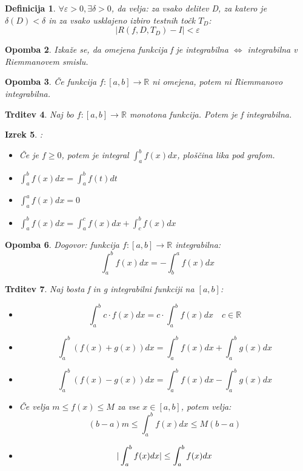 \documentclass[11pt]{article}
\newtheorem{Izrek}{{\sc Izrek}}[section]
\newtheorem{Trditev}[Izrek]{{\sc Trditev}}
\newtheorem{Definicija}[Izrek]{{\sc Definicija}}
\newtheorem{Opomba}[Izrek]{{\sc Opomba}}
\begin{document}
\begin{Definicija}
	$\forall \varepsilon > 0, \exists \delta >0$, da velja: za vsako delitev D, za katero je $\delta(D) < \delta$ in za vsako usklajeno izbiro testnih točk $T_D$:
	$$|R(f,D,T_D) - I| < \varepsilon$$
\end{Definicija}
\begin{Opomba}
	Izkaže se, da omejena funkcija f je integrabilna $\iff$ integrabilna v Riemmanovem smislu.
\end{Opomba}
\begin{Opomba}
	Če funkcija $f:[a,b] \to \mathbb{R}$ ni omejena, potem ni Riemmanovo integrabilna.
\end{Opomba}
\begin{Trditev}
	Naj bo $f:[a,b] \to \mathbb{R}$ monotona funkcija. Potem je f integrabilna.
\end{Trditev}
\begin{Izrek}:
	\begin{itemize}
		\item
		Če je $f \ge 0$, potem je integral $\int_{a}^{b}{f(x) dx}$, ploščina lika pod grafom.
		\item
		$\int_{a}^{b}{f(x)dx} = \int_{a}^{b}{f(t) dt}$	
		\item
		$\int_{a}^{a}{f(x) dx} = 0$
		\item
		$\int_{a}^{b}{f(x) dx} = \int_{a}^{c}{f(x) dx} + \int_{c}^{b}{f(x) dx}$	
	\end{itemize}
\end{Izrek}
\begin{Opomba}
	Dogovor: funkcija $f:[a,b] \to \mathbb{R}$ integrabilna: $$\int_{a}^{b}{f(x) dx} = - \int_{b}^{a}{f(x) dx}$$
\end{Opomba}
\begin{Trditev}
	Naj bosta f in g integrabilni funkciji na $[a,b]$:
	\begin{itemize}
		\item
		$$\int_{a}^{b}{c\cdot f(x) dx} = c\cdot  \int_{a}^{b}{f(x) dx} \quad c\in \mathbb{R}$$
		\item
		$$\int_{a}^{b}{(f(x)+g(x)) dx} =\int_{a}^{b}{ f(x) dx} + \int_{a}^{b}{g(x) dx}$$
		\item
		$$\int_{a}^{b}{(f(x)- g(x)) dx} =\int_{a}^{b}{ f(x) dx} - \int_{a}^{b}{g(x) dx}$$
		\item
		Če velja $m\le f(x) \le M$ za vse $x\in [a,b]$, potem velja:
		$$(b-a) m \le \int_{a}^{b}{ f(x) dx} \le M(b-a)$$
		\item
		$$\arrowvert \int_{a}^{b}{f(x) dx}\arrowvert \le  \int_{a}^{b}{f(x) dx}$$
	\end{itemize}
\end{Trditev}
\end{document}
